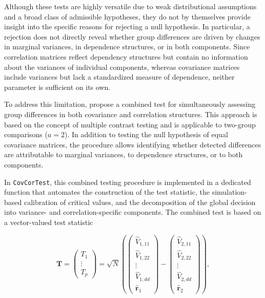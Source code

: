 Although these tests are highly versatile due to
weak distributional assumptions and a broad class of admissible hypotheses, they do not by themselves provide insight into the specific reasons for rejecting a null hypothesis. In particular, a rejection does not directly reveal whether group differences are driven by changes in marginal variances, in dependence structures, or in both components. Since correlation matrices reflect dependency structures but contain no information about the variances of individual components, whereas covariance matrices include variances but lack a standardized measure of dependence, neither parameter is sufficient on its own.

To address this limitation, \citet{sattler2023} propose a combined test for simultaneously assessing group differences in both covariance and correlation structures.
This approach is based on the concept of multiple contrast testing \citep[see, e.g.,][]{bretz2001} and is applicable to two-group comparisons (\(a=2\)). In addition to testing the null hypothesis of equal covariance matrices, the procedure allows identifying whether detected differences are attributable to marginal variances, to dependence structures, or to both components.

In \texttt{CovCorTest}, this combined testing procedure is implemented in a dedicated function that automates the construction of the test statistic, the simulation-based calibration of critical values, and the decomposition of the global decision into variance- and correlation-specific components. The combined test is based on a vector-valued test statistic

\begin{equation}
\boldsymbol{T}
=
\begin{pmatrix}
T_1\\
\vdots\\
T_p
\end{pmatrix}
=
\sqrt{N}
\left(
\begin{pmatrix}
\widehat{V}_{1,11}\\
\widehat{V}_{1,22}\\
\vdots\\
\widehat{V}_{1,dd}\\
\widehat{\boldsymbol{r}}_1
\end{pmatrix}
-
\begin{pmatrix}
\widehat{V}_{2,11}\\
\widehat{V}_{2,22}\\
\vdots\\
\widehat{V}_{2,dd}\\
\widehat{\boldsymbol{r}}_2
\end{pmatrix}
\right),
\label{eq:combined-statistic}
\end{equation}

